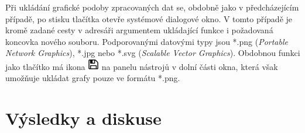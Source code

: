 \documentclass[a4paper, 12pt]{article}
\newcommand*{\Icon}{\includegraphics[width=0.5cm, height=0.5cm]{icon.PNG}}%
\begin{document}
Při ukládání grafické podoby zpracovaných dat se, obdobně jako v předcházejícím případě, po stisku tlačítka  otevře systémové dialogové okno. V tomto případě je kromě zadané cesty v adresáři argumentem ukládající funkce i požadovaná koncovka nového souboru. Podporovanými datovými typy jsou *.png (\textit{Portable Network Graphics}), *.jpg nebo *.svg (\textit{Scalable Vector Graphics}). Obdobnou funkci jako tlačítko  má ikona \hspace{0.09cm}\Icon\hspace{0.09cm} na panelu nástrojů v dolní části okna, která však umožňuje ukládat grafy pouze ve formátu *.png.

\newpage

\section{Výsledky a diskuse} \label{sec:diskuze}
\end{document}
